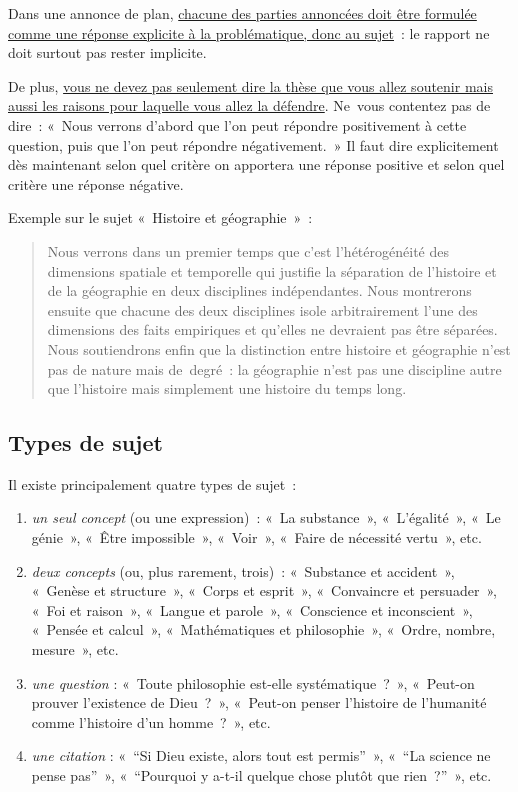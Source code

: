 \documentclass[a4paper,12pt]{article}
\begin{document}
Dans une annonce de plan, \uline{chacune des parties annoncées doit être
formulée comme une réponse explicite à la problématique, donc au
sujet} : le rapport ne doit surtout pas rester implicite. 

De plus, \uline{vous ne devez pas seulement dire la thèse que vous allez
soutenir mais aussi les raisons pour laquelle vous allez la défendre}.
Ne vous contentez pas de dire : « Nous verrons d'abord que l'on peut
répondre positivement à cette question, puis que l'on peut répondre
négativement. » Il faut dire explicitement dès maintenant selon quel
critère on apportera une réponse positive et selon quel critère une
réponse négative. 

Exemple sur le sujet « Histoire et géographie » : 
\begin{quotation}
Nous verrons dans un premier temps que c'est l'hétérogénéité des
dimensions spatiale et temporelle qui justifie la séparation de
l'histoire et de la géographie en deux disciplines indépendantes. Nous
montrerons ensuite que chacune des deux disciplines isole arbitrairement
l'une des dimensions des faits empiriques et qu'elles ne devraient pas
être séparées. Nous soutiendrons enfin que la distinction entre histoire
et géographie n'est pas de nature mais de degré : la géographie n'est
pas une discipline autre que l'histoire mais simplement une histoire du
temps long.
\end{quotation}


\subsection{Types de sujet}
\label{sec-2-5}
\label{types}

Il existe principalement quatre types de sujet :

\begin{enumerate}
\item \emph{un seul concept} (ou une expression) : « La substance », « L'égalité »,
« Le génie », « Être impossible », « Voir », « Faire de nécessité vertu »,
etc.

\item \emph{deux concepts} (ou, plus rarement, trois) : « Substance et
accident », « Genèse et structure », « Corps et esprit »,
« Convaincre et persuader », « Foi et raison », « Langue et parole »,
« Conscience et inconscient », « Pensée et calcul », « Mathématiques
et philosophie », « Ordre, nombre, mesure », etc.

\item \emph{une question} : « Toute philosophie est-elle systématique ? »,
« Peut-on prouver l'existence de Dieu ? », « Peut-on penser l'histoire
de l'humanité comme l'histoire d'un homme ? », etc.

\item \emph{une citation} : « ``Si Dieu existe, alors tout est permis'' »,
« ``La science ne pense pas'' », « ``Pourquoi y a-t-il quelque chose
plutôt que rien ?'' », etc.
\end{enumerate}
\end{document}
